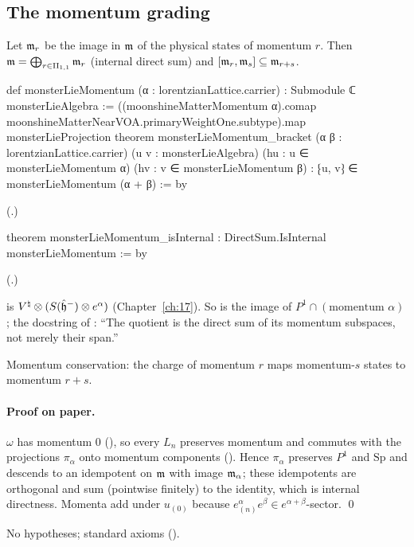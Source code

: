 \subsection{The momentum grading}

\begin{theorem}\label{ch18:thm:grading}
Let $\mathfrak{m}_r$ be the image in $\mathfrak{m}$ of the physical states of momentum $r$.  Then $\mathfrak{m}=\bigoplus_{r\in\mathrm{II}_{1,1}}\mathfrak{m}_r$
(internal direct sum) and $[\mathfrak{m}_r,\mathfrak{m}_s]\subseteq\mathfrak{m}_{r+s}$.
\end{theorem}
\begin{leancode}
def monsterLieMomentum (α : lorentzianLattice.carrier) : Submodule ℂ monsterLieAlgebra :=
  ((moonshineMatterMomentum α).comap moonshineMatterNearVOA.primaryWeightOne.subtype).map
    monsterLieProjection
theorem monsterLieMomentum_bracket (α β : lorentzianLattice.carrier)
    (u v : monsterLieAlgebra) (hu : u ∈ monsterLieMomentum α)
    (hv : v ∈ monsterLieMomentum β) : ⁅u, v⁆ ∈ monsterLieMomentum (α + β) := by
\end{leancode}
(.)
\begin{leancode}
theorem monsterLieMomentum_isInternal : DirectSum.IsInternal monsterLieMomentum := by
\end{leancode}
(.)
\begin{dictionary}
 is ${V^{\natural}}\otimes(S(\hat{\mathfrak h}^-)\otimes e^\alpha)$ (Chapter~\ref{ch:17}).  So
 is the image of $P^1\cap(\text{momentum }\alpha)$; the docstring of
: ``The quotient is the direct sum of its momentum subspaces, not
merely their span.''
\end{dictionary}
\begin{physics}Momentum conservation: the charge of momentum $r$ maps momentum-$s$ states to momentum $r+s$.\end{physics}
\paragraph{Proof on paper.}  $\omega$ has momentum $0$ (), so every $L_n$
preserves momentum and commutes with the projections $\pi_\alpha$ onto momentum components
().  Hence $\pi_\alpha$ preserves $P^1$ and $\mathrm{Sp}$ and descends to an
idempotent  on $\mathfrak{m}$ with image $\mathfrak{m}_\alpha$; these idempotents are
orthogonal and sum (pointwise finitely) to the identity, which is internal directness.  Momenta add under
$u_{(0)}$ because $e^\alpha_{(n)}e^\beta\in e^{\alpha+\beta}$-sector. \qed
\begin{status}No hypotheses; standard axioms ().\end{status}

